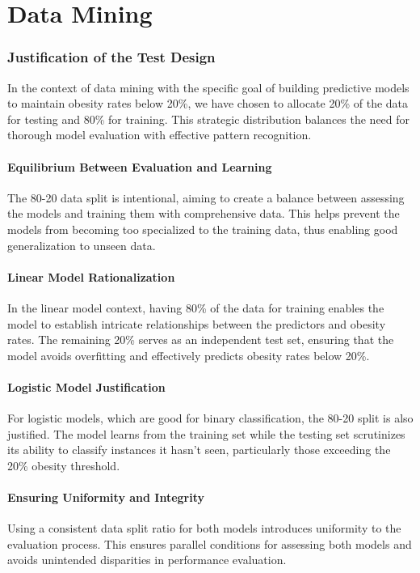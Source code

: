 \part{Data Mining}


    \section{Justification of the Test Design}

        In the context of data mining with the specific goal of building predictive models to maintain obesity rates below 20\%, we have chosen to allocate 20\% of the data for testing and 80\% for training. This strategic distribution balances the need for thorough model evaluation with effective pattern recognition.

        \subsection{Equilibrium Between Evaluation and Learning}
            The 80-20 data split is intentional, aiming to create a balance between assessing the models and training them with comprehensive data. This helps prevent the models from becoming too specialized to the training data, thus enabling good generalization to unseen data.

        \subsection{Linear Model Rationalization}
            In the linear model context, having 80\% of the data for training enables the model to establish intricate relationships between the predictors and obesity rates. The remaining 20\% serves as an independent test set, ensuring that the model avoids overfitting and effectively predicts obesity rates below 20\%.

        \subsection{Logistic Model Justification}
            For logistic models, which are good for binary classification, the 80-20 split is also justified. The model learns from the training set while the testing set scrutinizes its ability to classify instances it hasn't seen, particularly those exceeding the 20\% obesity threshold.

        \subsection{Ensuring Uniformity and Integrity}
            Using a consistent data split ratio for both models introduces uniformity to the evaluation process. This ensures parallel conditions for assessing both models and avoids unintended disparities in performance evaluation.

